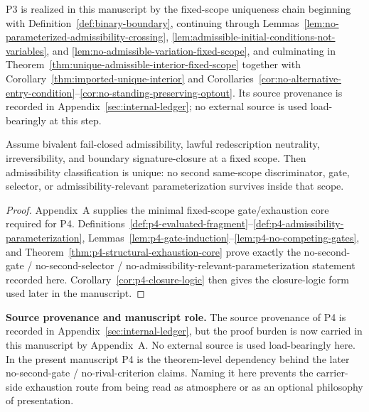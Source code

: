 \begin{remark}\label{rem:p3-proof-location}
P3 is realized in this manuscript by the fixed-scope uniqueness chain beginning with Definition~\ref{def:binary-boundary}, continuing through Lemmas~\ref{lem:no-parameterized-admissibility-crossing}, \ref{lem:admissible-initial-conditions-not-variables}, and \ref{lem:no-admissible-variation-fixed-scope}, and culminating in Theorem~\ref{thm:unique-admissible-interior-fixed-scope} together with Corollary~\ref{thm:imported-unique-interior} and Corollaries~\ref{cor:no-alternative-entry-condition}--\ref{cor:no-standing-preserving-optout}. Its source provenance is recorded in Appendix~\ref{sec:internal-ledger}; no external source is used load-bearingly at this step.
\end{remark}

\begin{manualtheorem}
\label{thm:imported-structural-exhaustion}
Assume bivalent fail-closed admissibility, lawful redescription neutrality, irreversibility, and boundary signature-closure at a fixed scope. Then admissibility classification is unique: no second same-scope discriminator, gate, selector, or admissibility-relevant parameterization survives inside that scope.
\end{manualtheorem}
\begin{proof}
Appendix~A supplies the minimal fixed-scope gate/exhaustion core required for P4. Definitions~\ref{def:p4-evaluated-fragment}--\ref{def:p4-admissibility-parameterization}, Lemmas~\ref{lem:p4-gate-induction}--\ref{lem:p4-no-competing-gates}, and Theorem~\ref{thm:p4-structural-exhaustion-core} prove exactly the no-second-gate / no-second-selector / no-admissibility-relevant-parameterization statement recorded here. Corollary~\ref{cor:p4-closure-logic} then gives the closure-logic form used later in the manuscript.
\end{proof}

\noindent\textbf{Source provenance and manuscript role.} The source provenance of P4 is recorded in Appendix~\ref{sec:internal-ledger}, but the proof burden is now carried in this manuscript by Appendix~A. No external source is used load-bearingly here. In the present manuscript P4 is the theorem-level dependency behind the later no-second-gate / no-rival-criterion claims. Naming it here prevents the carrier-side exhaustion route from being read as atmosphere or as an optional philosophy of presentation.


